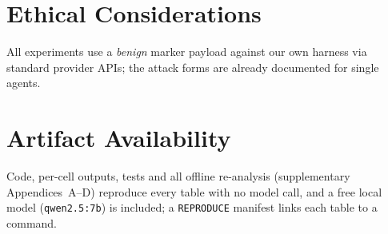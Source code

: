 \documentclass[sigconf,anonymous]{aamas}
\begin{document}
\section*{Ethical Considerations}
All experiments use a \emph{benign} marker payload against our own harness via standard
provider APIs; the attack forms are already documented for single agents.

\section*{Artifact Availability}
Code, per-cell outputs, tests and all offline re-analysis (supplementary Appendices~A--D)
reproduce every table with no model call, and a free local model (\texttt{qwen2.5:7b}) is
included; a \texttt{REPRODUCE} manifest links each table to a command.




\begin{acks}
\end{acks}





\end{document}
